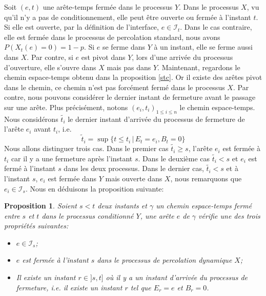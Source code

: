 \documentclass[titlepage,a4paper,12pt]{article}
\newcounter{th}
\newcounter{propo}
\newtheorem{prop}[propo]{Proposition}
\begin{document}
Soit $(e,t)$ une arête-temps fermée dans le processus $Y$. Dans le processus $X$, vu qu'il n'y a pas de conditionnement, elle peut être ouverte ou fermée à l'instant $t$. Si elle est ouverte, par la définition de l'interface, $e\in \mathcal{I}_t$. Dans le cas contraire, elle est fermée dans le processus de percolation standard, nous avons $P(X_t(e) = 0) = 1-p$. Si $e$ se ferme dans $Y$ à un instant, elle se ferme aussi dans $X$. Par contre, si $e$ est pivot dans $Y$, lors d'une arrivée du processus d'ouverture, elle s'ouvre dans $X$ mais pas dans $Y$. Maintenant, regardons le chemin espace-temps obtenu dans la proposition \ref{stc}. Or il existe des arêtes pivot dans le chemin, ce chemin n'est pas forcément fermé dans le processus $X$. Par contre, nous pouvons considérer le dernier instant de fermeture avant le passage sur une arête. Plus précisément, notons $(e_i,t_i)_{1\leqslant i \leqslant n}$ le chemin espace-temps. Nous considérons $\tilde{t_i}$ le dernier instant d'arrivée du processus de fermeture de l'arête $e_i$ avant $t_i$, i.e.
$$ \tilde{t}_i = \sup \big\{ t\leqslant t_i\,|\, E_{t} = e_i, B_t = 0\big\}
$$
Nous allons distinguer trois cas. Dans le premier cas $\tilde{t_i}\geqslant s$, l'arête $e_i$ est fermée à $t_i$ car il y a une fermeture après l'instant $s$. Dans le deuxième cas $\tilde{t_i}< s$ et $e_i$ est fermé à l'instant $s$ dans les deux processus. Dans le dernier cas, $\tilde{t_i}< s$ et à l'instant $s$, $e_i$ est fermée dans $Y$ mais ouverte dans $X$, nous remarquons que $e_i \in \mathcal{I}_s$. Nous en déduisons la proposition suivante:

\begin{prop}\label{couple} Soient $s<t$ deux instants et $\gamma$ un chemin espace-temps fermé entre $s$ et $t$ dans le processus conditionné $Y$, une arête $e$ de $\gamma$ vérifie une des trois propriétés suivantes:
\begin{itemize}[leftmargin = 0.9cm]
\item[(A)] $e\in \mathcal{I}_s$;
\item[(B)] $e$ est fermée à l'instant $s$ dans le processus de percolation dynamique $X$;
\item[(C)] Il existe un instant $r\in ]s,t]$ où il y a un instant d'arrivée du processus de fermeture, i.e. il existe un instant $r$ tel que $E_r = e$ et $B_r = 0$.
\end{itemize}
\end{prop}
\end{document}
